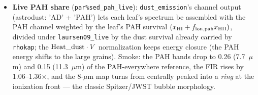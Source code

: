 \documentclass[english,a4paper]{my_memo}
\newcommand{\code}[1]{\texttt{#1}}
\begin{document}
\begin{itemize}
  $\int L_\lambda d\lambda = 4.296{\times}10^{38}$~erg/s $= \sum
  {\rm Heat\_dust}\,V$ to 4 digits; the SED shows the PAH bands at
  3.3/6.2/7.7/8.6/11.3/12.7/17~$\mu$m over a warm 20--60~$\mu$m
  plateau with the FIR falloff --- the canonical stochastically
  heated spectrum for a hot compact field.
\item \textbf{Live PAH share} (\code{par\%sed\_pah\_live}):
  \code{dust\_emission}'s channel output (astrodust: 'AD' + 'PAH')
  lets each leaf's spectrum be assembled with the PAH channel weighted
  by the leaf's PAH survival $(x_{\rm HI} + f_{\rm ion,pah}
  x_{\rm HII})$, divided under \code{laursen09\_live} by the dust
  survival already carried by \code{rhokap}; the
  ${\rm Heat\_dust}\cdot V$ normalization keeps energy closure (the
  PAH energy shifts to the large grains).  Smoke: the PAH bands drop
  to 0.26 (7.7~$\mu$m) and 0.15 (11.3~$\mu$m) of the
  PAH-everywhere reference, the FIR rises by 1.06--1.36$\times$, and
  the 8-$\mu$m map turns from centrally peaked into a \emph{ring} at
  the ionization front --- the classic Spitzer/JWST bubble morphology.
\end{itemize}
\end{document}
